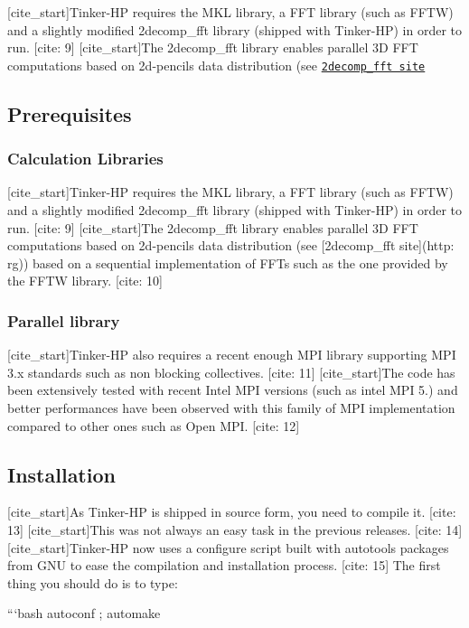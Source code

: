 \mbox{[}cite\-\_\-start\mbox{]}Tinker-\/\-H\-P requires the M\-K\-L library, a F\-F\-T library (such as F\-F\-T\-W) and a slightly modified 2decomp\-\_\-fft library (shipped with Tinker-\/\-H\-P) in order to run. \mbox{[}cite\-: 9\mbox{]} \mbox{[}cite\-\_\-start\mbox{]}The 2decomp\-\_\-fft library enables parallel 3\-D F\-F\-T computations based on 2d-\/pencils data distribution (see \href{http://vecomsjournal.org/article/10409-raising-the-performance-of-the-tinker-hp-molecular-modeling-package-article-v1-0}{\tt 2decomp\-\_\-fft site} 



\subsection*{Prerequisites}

\subsubsection*{Calculation Libraries}

\mbox{[}cite\-\_\-start\mbox{]}Tinker-\/\-H\-P requires the M\-K\-L library, a F\-F\-T library (such as F\-F\-T\-W) and a slightly modified 2decomp\-\_\-fft library (shipped with Tinker-\/\-H\-P) in order to run. \mbox{[}cite\-: 9\mbox{]} \mbox{[}cite\-\_\-start\mbox{]}The 2decomp\-\_\-fft library enables parallel 3\-D F\-F\-T computations based on 2d-\/pencils data distribution (see \mbox{[}2decomp\-\_\-fft site\mbox{]}(http\-: rg)) based on a sequential implementation of F\-F\-Ts such as the one provided by the F\-F\-T\-W library. \mbox{[}cite\-: 10\mbox{]}

\subsubsection*{Parallel library}

\mbox{[}cite\-\_\-start\mbox{]}Tinker-\/\-H\-P also requires a recent enough M\-P\-I library supporting M\-P\-I 3.\-x standards such as non blocking collectives. \mbox{[}cite\-: 11\mbox{]} \mbox{[}cite\-\_\-start\mbox{]}The code has been extensively tested with recent Intel M\-P\-I versions (such as intel M\-P\-I 5.) and better performances have been observed with this family of M\-P\-I implementation compared to other ones such as Open M\-P\-I. \mbox{[}cite\-: 12\mbox{]} 



\subsection*{Installation}

\mbox{[}cite\-\_\-start\mbox{]}As Tinker-\/\-H\-P is shipped in source form, you need to compile it. \mbox{[}cite\-: 13\mbox{]} \mbox{[}cite\-\_\-start\mbox{]}This was not always an easy task in the previous releases. \mbox{[}cite\-: 14\mbox{]} \mbox{[}cite\-\_\-start\mbox{]}Tinker-\/\-H\-P now uses a {\ttfamily configure} script built with autotools packages from G\-N\-U to ease the compilation and installation process. \mbox{[}cite\-: 15\mbox{]} The first thing you should do is to type\-:

```bash autoconf ; automake 